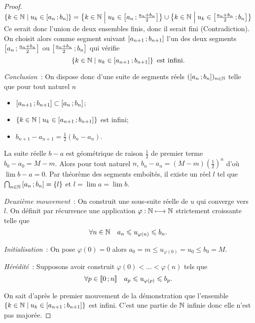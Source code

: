\begin{proof}
$\left\{k \in \mathbb{N}\mathrel{}\middle|\mathrel{}u_k \in \left[ a_n \, ;  b_n \right]\right\}= \left\{k \in \mathbb{N}\mathrel{}\middle|\mathrel{}u_k \in \left[ a_n \, ;  \frac{a_n+b_n}{2} \right]\right\} \cup \left\{k \in \mathbb{N}\mathrel{}\middle|\mathrel{}u_k \in \left[ \frac{a_n+b_n}{2} \, ;  b_n \right]\right\}$
Ce serait donc l'union de deux ensembles finis, donc il serait fini (Contradiction). On choisit alors comme segment suivant $\left[ a_{n+1} \, ;  b_{n+1} \right]$ l'un des deux segments $\left[ a_n \, ;  \frac{a_n+b_n}{2} \right]$ ou $\left[ \frac{a_n+b_n}{2} \, ;  b_n \right]$ qui vérifie
\begin{equation}
  \left\{k \in \mathbb{N}\mathrel{}\middle|\mathrel{}u_k \in \left[ a_{n+1} \, ;  b_{n+1} \right]\right\} \text{~est infini}.
\end{equation}

\emph{Conclusion}~: On dispose donc d'une suite de segments réels $(\left[ a_n \, ;  b_n \right])_{n \in \mathbb{N}}$ telle que pour tout naturel $n$
\begin{itemize}
\item $\left[ a_{n+1} \, ;  b_{n+1} \right] \subset \left[ a_{n} \, ;  b_{n} \right]$;
\item $\left\{k \in \mathbb{N}\mathrel{}\middle|\mathrel{}u_k \in \left[ a_{n+1} \, ;  b_{n+1} \right]\right\}$ est infini;
\item $b_{n+1}-a_{n+1}=\frac{1}{2}(b_n-a_n)$.
\end{itemize}

La suite réelle $b-a$ est géométrique de raison $\frac{1}{2}$ de premier terme $b_0-a_0=M-m$. Alors pour tout naturel $n$, $b_n-a_n=(M-m) \left(\frac{1}{2}\right)^n$ d'où $\lim b-a=0$. Par théorème des segments emboîtés, il existe un réel $l$ tel que $\bigcap_{n \in \mathbb{N}} \left[ a_{n} \, ;  b_{n} \right]=\{l\}$ et $l=\lim a = \lim b$.

\emph{Deuxième mouvement}~: On construit une sous-suite réelle de $u$ qui converge vers $l$. On définit par récurrence une application $\varphi : \mathbb{N} \longmapsto \mathbb{N}$ strictement croissante telle que
\begin{equation}
  \forall n \in \mathbb{N} \quad a_n \leqslant u_{\varphi(n)} \leqslant b_n.
\end{equation}

\emph{Initialisation}~: On pose $\varphi(0)=0$ alors $a_0=m \leqslant u_{\varphi(0)}=u_{0} \leqslant b_0=M$.

\emph{Hérédité}~: Supposons avoir construit $\varphi(0) < \ldots < \varphi(n)$ tels que
\begin{equation}
  \forall p \in \mathopen{\llbracket}0\mathclose{}\mathpunct{};n\mathclose{\rrbracket} \quad a_p \leqslant u_{\varphi(p)} \leqslant b_p.
\end{equation}

On sait d'après le premier mouvement de la démonstration que l'ensemble $\left\{k \in \mathbb{N}\mathrel{}\middle|\mathrel{}u_k \in \left[ a_{n+1} \, ;  b_{n+1} \right]\right\}$ est infini. C'est une partie de $\mathbb{N}$ infinie donc elle n'est pas majorée.


\end{proof}
